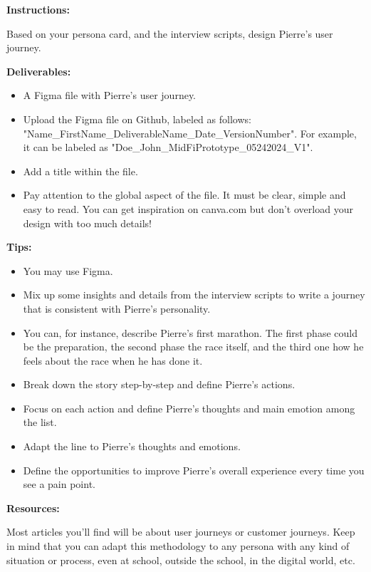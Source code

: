 \makeheaderfiles

\textbf{Instructions:}

Based on your persona card, and the interview scripts, design Pierre's user journey.

\textbf{Deliverables:}

\begin{itemize}
\item A Figma file with Pierre's user journey.
\item Upload the Figma file on Github, labeled as follows: "Name\_FirstName\_DeliverableName\_Date\_VersionNumber". For example, it can be labeled as "Doe\_John\_MidFiPrototype\_05242024\_V1".
\item Add a title within the file.
\item Pay attention to the global aspect of the file. It must be clear, simple and easy to read. You can get inspiration on canva.com but don't overload your design with too much details!
\end{itemize}

\textbf{Tips:}

\begin{itemize}
\item You may use Figma.
\item Mix up some insights and details from the interview scripts to write a journey that is consistent with Pierre's personality.
\item You can, for instance, describe Pierre's first marathon. The first phase could be the preparation, the second phase the race itself, and the third one how he feels about the race when he has done it.
\item Break down the story step-by-step and define Pierre's actions.
\item Focus on each action and define Pierre's thoughts and main emotion among the list.
\item Adapt the line to Pierre's thoughts and emotions.
\item Define the opportunities to improve Pierre's overall experience every time you see a pain point.
\end{itemize}

\textbf{Resources:}

Most articles you'll find will be about user journeys or customer journeys. Keep in mind that you can adapt this methodology to any persona with any kind of situation or process, even at school, outside the school, in the digital world, etc.


